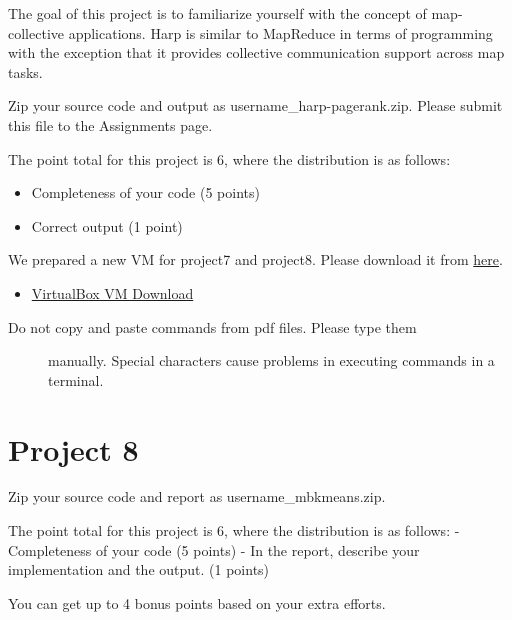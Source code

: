 The goal of this project is to familiarize yourself with the concept of
map-collective applications. Harp is similar to MapReduce in terms of
programming with the exception that it provides collective communication
support across map tasks.

Zip your source code and output as username\_harp-pagerank.zip. Please
submit this file to the Assignments page.

The point total for this project is 6, where the distribution is as
follows:

\begin{itemize}
\tightlist
\item
  Completeness of your code (5 points)
\item
  Correct output (1 point)
\end{itemize}

We prepared a new VM for project7 and project8. Please download it from
\href{https://drive.google.com/file/d/0B2iFsq4CY1DteHhJUEk5cDNJajQ/view}{here}.

\begin{itemize}
\tightlist
\item
  \href{https://drive.google.com/file/d/0B2iFsq4CY1DteHhJUEk5cDNJajQ/view}{VirtualBox
  VM Download}
\end{itemize}



\begin{description}
\item[Do not copy and paste commands from pdf files. Please type them]
manually. Special characters cause problems in executing commands in a
terminal.
\end{description}

\chapter{Project 8}\label{project-8}

Zip your source code and report as username\_mbkmeans.zip.

The point total for this project is 6, where the distribution is as
follows: - Completeness of your code (5 points) - In the report,
describe your implementation and the output. (1 points)

You can get up to 4 bonus points based on your extra efforts.


